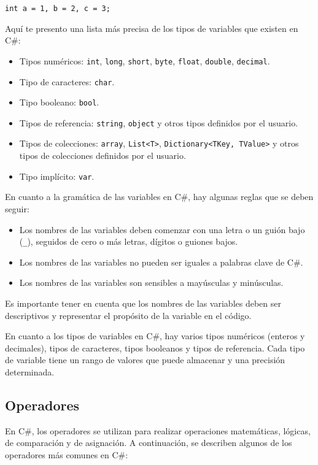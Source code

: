 \documentclass[executivepaper]{article}
\begin{document}
\begin{lstlisting}
int a = 1, b = 2, c = 3;
\end{lstlisting}

Aquí te presento una lista más precisa de los tipos de variables que existen en C\#:

\begin{itemize}
\item Tipos numéricos: \verb|int|, \verb|long|, \verb|short|, \verb|byte|, \verb|float|, \verb|double|, \verb|decimal|.
\item Tipo de caracteres: \verb|char|.
\item Tipo booleano: \verb|bool|.
\item Tipos de referencia: \verb|string|, \verb|object| y otros tipos definidos por el usuario.
\item Tipos de colecciones: \verb|array|, \verb|List<T>|, \verb|Dictionary<TKey, TValue>| y otros tipos de colecciones definidos por el usuario.
\item Tipo implícito: \verb|var|.
\end{itemize}

En cuanto a la gramática de las variables en  C\#, hay algunas reglas que se deben seguir:

\begin{itemize}
\item Los nombres de las variables deben comenzar con una letra o un guión bajo (\verb|_|), seguidos de cero o más letras, dígitos o guiones bajos.
\item Los nombres de las variables no pueden ser iguales a palabras clave de  C\#.
\item Los nombres de las variables son sensibles a mayúsculas y minúsculas.
\end{itemize}

Es importante tener en cuenta que los nombres de las variables deben ser descriptivos y representar el propósito de la variable en el código.

En cuanto a los tipos de variables en  C\#, hay varios tipos numéricos (enteros y decimales), tipos de caracteres, tipos booleanos y tipos de referencia. Cada tipo de variable tiene un rango de valores que puede almacenar y una precisión determinada.

\subsection{Operadores}

En C\#, los operadores se utilizan para realizar operaciones matemáticas, lógicas, de comparación y de asignación. A continuación, se describen algunos de los operadores más comunes en C\#:
\end{document}

